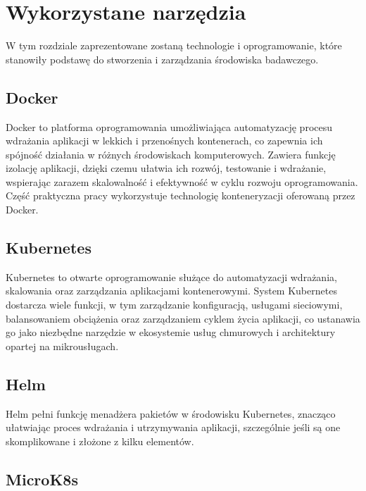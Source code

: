 \newpage

\section{Wykorzystane narzędzia}\label{sec:wykorzystane-narzedzia}

W tym rozdziale zaprezentowane zostaną technologie i oprogramowanie, które stanowiły podstawę do stworzenia i zarządzania środowiska badawczego.

\subsection{Docker}\label{subsec:docker}

Docker to platforma oprogramowania umożliwiająca automatyzację procesu wdrażania aplikacji w lekkich i przenośnych kontenerach, co zapewnia ich spójność działania w różnych środowiskach komputerowych.
Zawiera funkcję izolację aplikacji, dzięki czemu ułatwia ich rozwój, testowanie i wdrażanie, wspierając zarazem skalowalność i efektywność w cyklu rozwoju oprogramowania.
Część praktyczna pracy wykorzystuje technologię konteneryzacji oferowaną przez Docker.

\subsection{Kubernetes}\label{subsec:kubernetes}

Kubernetes to otwarte oprogramowanie służące do automatyzacji wdrażania, skalowania oraz zarządzania aplikacjami kontenerowymi.
System Kubernetes dostarcza wiele funkcji, w tym zarządzanie konfiguracją, usługami sieciowymi, balansowaniem obciążenia oraz zarządzaniem cyklem życia aplikacji, co ustanawia go jako niezbędne narzędzie w ekosystemie usług chmurowych i architektury opartej na mikrousługach.

\subsection{Helm}\label{subsec:helm}

Helm pełni funkcję menadżera pakietów w środowisku Kubernetes, znacząco ułatwiając proces wdrażania i utrzymywania aplikacji, szczególnie jeśli są one skomplikowane i złożone z kilku elementów.

\subsection{MicroK8s}\label{subsec:microk8s}

